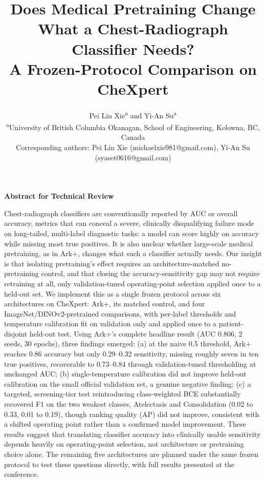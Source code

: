 \documentclass[11pt]{article}
\title{\vspace{-1.5em}\Large\bfseries Does Medical Pretraining Change What a Chest-Radiograph Classifier Needs?\\[2pt] A Frozen-Protocol Comparison on CheXpert}
\author{
  Pei Lin Xie\textsuperscript{a} and Yi-An Su\textsuperscript{a} \\[2pt]
  \small \textsuperscript{a}University of British Columbia Okanagan, School of Engineering, Kelowna, BC, Canada \\
  \small Corresponding authors: Pei Lin Xie (michaelxie981@gmail.com), Yi-An Su (syaset0616@gmail.com)
}
\date{}
\begin{document}
\maketitle
\vspace{-2em}

\begin{center}
{\large\bfseries Abstract for Technical Review}\\[2pt]
\end{center}

\vspace{1em}
\noindent
Chest-radiograph classifiers are conventionally reported by AUC or overall accuracy, metrics that can conceal a severe, clinically disqualifying failure mode on long-tailed, multi-label diagnostic tasks: a model can score highly on accuracy while missing most true positives. It is also unclear whether large-scale medical pretraining, as in Ark+, changes what such a classifier actually needs. Our insight is that isolating pretraining's effect requires an architecture-matched no-pretraining control, and that closing the accuracy-sensitivity gap may not require retraining at all, only validation-tuned operating-point selection applied once to a held-out set. We implement this as a single frozen protocol across six architectures on CheXpert: Ark+, its matched control, and four ImageNet/DINOv2-pretrained comparisons, with per-label thresholds and temperature calibration fit on validation only and applied once to a patient-disjoint held-out test. Using Ark+'s complete headline result (AUC 0.806, 2 seeds, 30 epochs), three findings emerged: (a) at the naive 0.5 threshold, Ark+ reaches 0.86 accuracy but only 0.29--0.32 sensitivity, missing roughly seven in ten true positives, recoverable to 0.73--0.84 through validation-tuned thresholding at unchanged AUC; (b) single-temperature calibration did not improve held-out calibration on the small official validation set, a genuine negative finding; (c) a targeted, screening-tier test reintroducing class-weighted BCE substantially recovered F1 on the two weakest classes, Atelectasis and Consolidation (0.02 to 0.33, 0.01 to 0.19), though ranking quality (AP) did not improve, consistent with a shifted operating point rather than a confirmed model improvement. These results suggest that translating classifier accuracy into clinically usable sensitivity depends heavily on operating-point selection, not architecture or pretraining choice alone. The remaining five architectures are planned under the same frozen protocol to test these questions directly, with full results presented at the conference.
\end{document}
